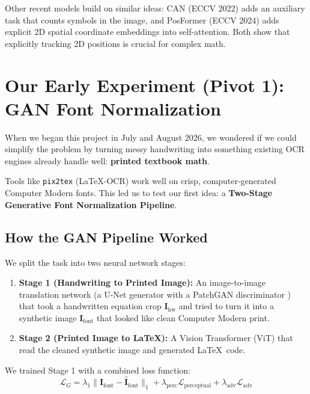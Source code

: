 Other recent models build on similar ideas: CAN (ECCV 2022) \cite{li2022can} adds an auxiliary task that counts symbols in the image, and PosFormer (ECCV 2024) \cite{zhao2024posformer} adds explicit 2D spatial coordinate embeddings into self-attention. Both show that explicitly tracking 2D positions is crucial for complex math.

\section{Our Early Experiment (Pivot 1): GAN Font Normalization}
\label{sec:pivot1_gan}

When we began this project in July and August 2026, we wondered if we could simplify the problem by turning messy handwriting into something existing OCR engines already handle well: \textbf{printed textbook math}.

Tools like \texttt{pix2tex} (LaTeX-OCR) \cite{blecher2023nougat} work well on crisp, computer-generated Computer Modern fonts. This led us to test our first idea: a \textbf{Two-Stage Generative Font Normalization Pipeline}.

\subsection{How the GAN Pipeline Worked}
We split the task into two neural network stages:
\begin{enumerate}
    \item \textbf{Stage 1 (Handwriting to Printed Image):} An image-to-image translation network (a U-Net generator with a PatchGAN discriminator \cite{isola2017image}) that took a handwritten equation crop $\mathbf{I}_{\text{hw}}$ and tried to turn it into a synthetic image $\mathbf{I}_{\text{font}}$ that looked like clean Computer Modern print.
    \item \textbf{Stage 2 (Printed Image to \LaTeX):} A Vision Transformer (ViT) that read the cleaned synthetic image and generated \LaTeX\ code.
\end{enumerate}

We trained Stage 1 with a combined loss function:
\begin{equation}
\mathcal{L}_G = \lambda_1 \|\mathbf{I}_{\text{font}} - \hat{\mathbf{I}}_{\text{font}}\|_1 + \lambda_{\text{perc}} \mathcal{L}_{\text{perceptual}} + \lambda_{\text{adv}} \mathcal{L}_{\text{adv}}
\end{equation}

